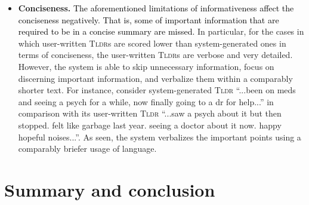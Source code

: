 \documentclass[10pt, a4paper]{article}
\newcommand{\tldr}{\textsc{Tldr}}
\begin{document}
\begin{itemize}[leftmargin=*,label={-}]
    \item \textbf{Conciseness. } \textcolor{black}{The aforementioned limitations of informativeness affect the conciseness negatively. That is, some of important information that are required to be in a concise summary are missed.} In particular, for the cases in which user-written \tldr s are scored lower than 
system-generated ones in terms of conciseness, the user-written \tldr s are verbose and very detailed.
However, the system is able to skip unnecessary information, focus on discerning important information, and verbalize them within a comparably shorter text. 
    For instance, consider system-generated \tldr{} ``{\selectfont ...been on meds and seeing a psych for a while, now finally going to a dr for help...}'' in comparison with its user-written \tldr{} ``{\selectfont ...saw a psych about it but then stopped. felt like garbage last year. seeing a doctor about it now. happy hopeful noises...}''. As seen, the system  verbalizes the important points using a comparably briefer usage of language.
    
    
\end{itemize}



%
 



\section{Summary and conclusion}
\end{document}
